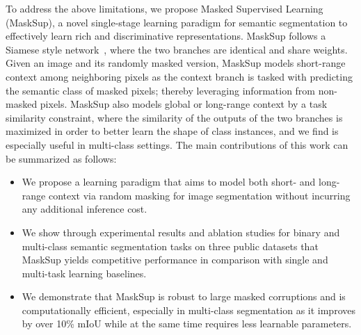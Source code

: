 \documentclass{bmvc2k}
\begin{document}
To address the above limitations, we propose Masked Supervised Learning (MaskSup), a novel single-stage learning paradigm for semantic segmentation to effectively learn rich and discriminative representations. MaskSup follows a Siamese style network~\cite{bromley1993signature}, where the two branches are identical and share weights. Given an image and its randomly masked version, MaskSup models short-range context among neighboring pixels as the context branch is tasked with predicting the semantic class of masked pixels; thereby leveraging information from non-masked pixels. MaskSup also models global or long-range context by a task similarity constraint, where the similarity of the outputs of the two branches is maximized in order to better learn the shape of class instances, and we find is especially useful in multi-class settings. The main contributions of this work can be summarized as follows:
\begin{itemize}
\item We propose a learning paradigm that aims to model both short- and long-range context via random masking for image segmentation without incurring any additional inference cost.
\item We show through experimental results and ablation studies for binary and multi-class semantic segmentation tasks on three public datasets that MaskSup yields competitive performance in comparison with single and multi-task learning baselines.
\item We demonstrate that MaskSup is robust to large masked corruptions and is computationally efficient, especially in multi-class segmentation as it improves by over 10\% mIoU while at the same time requires  less learnable parameters.
\end{itemize}
\end{document}
